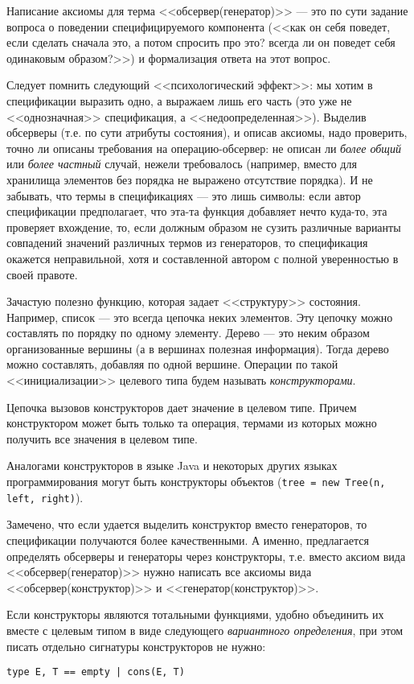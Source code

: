 Написание аксиомы для терма <<обсервер(генератор)>> --- это по сути задание вопроса о поведении специфицируемого компонента (<<как он себя поведет, если сделать сначала это, а потом спросить про это? всегда ли он поведет себя одинаковым образом?>>) и формализация ответа на этот вопрос.

Следует помнить следующий <<психологический эффект>>: мы хотим в спецификации выразить одно, а выражаем лишь его часть (это уже не <<однозначная>> спецификация, а <<недоопределенная>>). Выделив обсерверы (т.е. по сути атрибуты состояния), и описав аксиомы, надо проверить, точно ли описаны требования на операцию-обсервер: не описан ли \emph{более общий} или \emph{более частный} случай, нежели требовалось (например, вместо для хранилища элементов без порядка не выражено отсутствие порядка). И не забывать, что термы в спецификациях --- это лишь символы: если автор спецификации предполагает, что эта-та функция добавляет нечто куда-то, эта проверяет вхождение, то, если должным образом не сузить различные варианты совпадений значений различных термов из генераторов, то спецификация окажется неправильной, хотя и составленной автором с полной уверенностью в своей правоте.


Зачастую полезно функцию, которая задает <<структуру>> состояния. Например, список --- это всегда цепочка неких элементов. Эту цепочку можно составлять по порядку по одному элементу. Дерево --- это неким образом организованные вершины (а в вершинах полезная информация). Тогда дерево можно составлять, добавляя по одной вершине. Операции по такой <<инициализации>> целевого типа будем называть \emph{конструкторами}.

Цепочка вызовов конструкторов дает значение в целевом типе. Причем конструктором может быть только та операция, термами из которых можно получить все значения в целевом типе.

Аналогами конструкторов в языке Java и некоторых других языках программирования могут быть конструкторы объектов (\texttt{tree = new Tree(n, left, right)}).

Замечено, что если удается выделить конструктор вместо генераторов, то спецификации получаются более качественными. А именно, предлагается определять обсерверы и генераторы через конструкторы, т.е. вместо аксиом вида <<обсервер(генератор)>> нужно написать все аксиомы вида <<обсервер(конструктор)>> и <<генератор(конструктор)>>.

Если конструкторы являются тотальными функциями, удобно объединить их вместе с целевым типом в виде следующего \emph{вариантного определения}, при этом писать отдельно сигнатуры конструкторов не нужно:
\begin{lstlisting}
type E, T == empty | cons(E, T)
\end{lstlisting}

